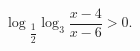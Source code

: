 \begin{ex}[type=inequality]
	\begin{condition}
		$\log$\tiny$_{\dfrac{1}{2}}$\normalsize$\log_3 \dfrac{x - 4}{x - 6}>0  .$
	\end{condition}
\end{ex}